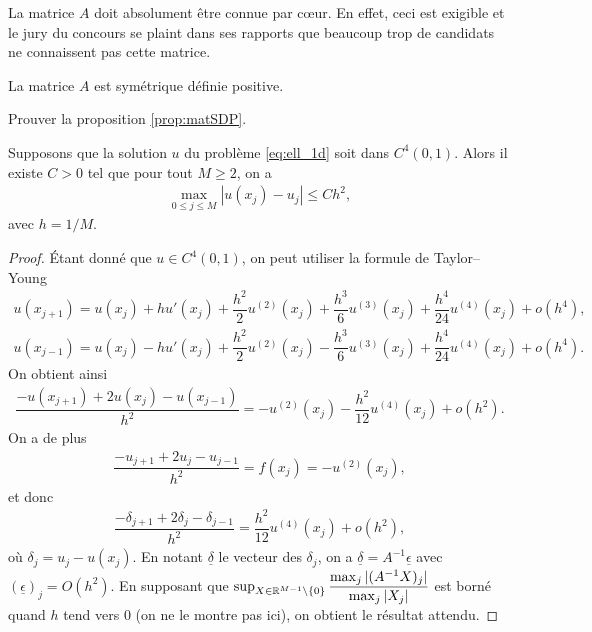 \documentclass[12pt,a4paper,twoside]{article}
\begin{document}
\begin{remark}
  La matrice $A$ doit absolument \^etre connue par c\oe{}ur.
  En effet, ceci est exigible et le jury du concours se plaint dans ses rapports
  que beaucoup trop de candidats ne connaissent pas cette matrice.
\end{remark}

\begin{proposition}
  \label{prop:matSDP}
  La matrice $A$ est sym\'etrique d\'efinie positive.
\end{proposition}


\begin{exercise}
  Prouver la proposition \ref{prop:matSDP}.
\end{exercise}

\begin{proposition}[Convergence]
  \label{prop:ell_conv}
  Supposons que la solution $u$ du probl\`eme \eqref{eq:ell_1d} soit 
  dans $C^4(0,1)$.
  Alors il existe $C>0$ tel que pour tout $M \geq 2$, on a
  \begin{align*}
    \max_{0 \leq j \leq M} | u(x_j) - u_j | \leq C h^2 ,
  \end{align*}
  avec $h = 1/M$.
\end{proposition}

\begin{proof}
  \'Etant donn\'e que $u \in C^{4}(0,1)$, on peut utiliser la formule de Taylor--Young
  \begin{align*}
    u(x_{j+1}) = u(x_j) + h u'(x_j) + \dfrac{h^2}{2} u^{(2)}(x_j) + \dfrac{h^3}{6} u^{(3)}(x_j)
    + \dfrac{h^4}{24} u^{(4)}(x_j) + o(h^4) ,
    \\
    u(x_{j-1}) = u(x_j) - h u'(x_j) + \dfrac{h^2}{2} u^{(2)}(x_j) - \dfrac{h^3}{6} u^{(3)}(x_j)
    + \dfrac{h^4}{24} u^{(4)}(x_j) + o(h^4) .
  \end{align*}
  On obtient ainsi
  \begin{align*}
    \dfrac{-u(x_{j+1}) + 2 u(x_j) - u(x_{j-1})}{h^2} = - u^{(2)}(x_j) - \dfrac{h^2}{12} u^{(4)}(x_j)
    + o (h^2) .
  \end{align*}
  On a de plus 
  \begin{align*}
    \dfrac{- u_{j+1} + 2 u_j - u_{j-1}}{h^2} = f(x_j) = - u^{(2)}(x_j) ,
  \end{align*}
  et donc
  \begin{align*}
    \dfrac{-\delta_{j+1} + 2 \delta_j - \delta_{j-1}}{h^2} = \dfrac{h^2}{12} u^{(4)}(x_j) + o(h^2) ,
  \end{align*}
  o\`u $\delta_j = u_j - u(x_j)$.
  En notant $\underline{\delta}$ le vecteur des $\delta_j$,
  on a $\underline{\delta} = A^{-1} \underline{\epsilon}$
  avec $(\underline{\epsilon})_j = O(h^2)$.
  En supposant que $\sup_{X \in \mathbb{R}^{M-1}\backslash \{0\}} \dfrac{\max_{j} |(A^{-1}X)_j|}{\max_j |X_j|}$
  est born\'e quand $h$ tend vers $0$ (on ne le montre pas ici), on obtient le r\'esultat attendu.
\end{proof}
\end{document}
